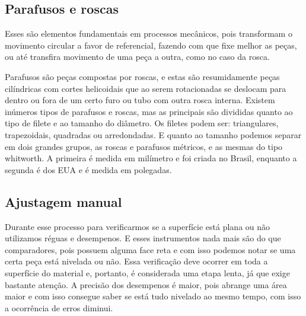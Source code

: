 \documentclass[
	12pt,				%
	oneside,			%
	a4paper,			%
	english,			%
	french,				%
	spanish,			%
	brazil,				%
	]{abntex2}
\begin{document}
\subsection{Parafusos e roscas}

Esses são elementos fundamentais em processos mecânicos, pois transformam o movimento circular a favor de referencial, fazendo com que fixe melhor as peças, ou até transfira movimento de uma peça a outra, como no caso da rosca.

Parafusos são peças compostas por roscas, e estas são resumidamente peças cilíndricas com cortes helicoidais que ao serem rotacionadas se deslocam para dentro ou fora de um certo furo ou tubo com outra rosca interna. Existem inúmeros tipos de parafusos e roscas, mas as principais são divididas quanto ao tipo de filete e ao tamanho do diâmetro. Os filetes podem ser: triangulares, trapezoidais, quadradas ou arredondadas. E quanto ao tamanho podemos separar em dois grandes grupos, as roscas e parafusos métricos, e as mesmas do tipo whitworth. A primeira é medida em milímetro e foi criada no Brasil, enquanto a segunda é dos EUA e é medida em polegadas.

\subsection{Ajustagem manual}

Durante esse processo para verificarmos se a superfície está plana ou não utilizamos réguas e desempenos. E esses instrumentos nada mais são do que comparadores, pois possuem alguma face reta e com isso podemos notar se uma certa peça está nivelada ou não. Essa verificação deve ocorrer em toda a superfície do material e, portanto, é considerada uma etapa lenta, já que exige bastante atenção. A precisão dos desempenos é maior, pois abrange uma área maior e com isso consegue saber se está tudo nivelado ao mesmo tempo, com isso a ocorrência de erros diminui.


\end{document}
